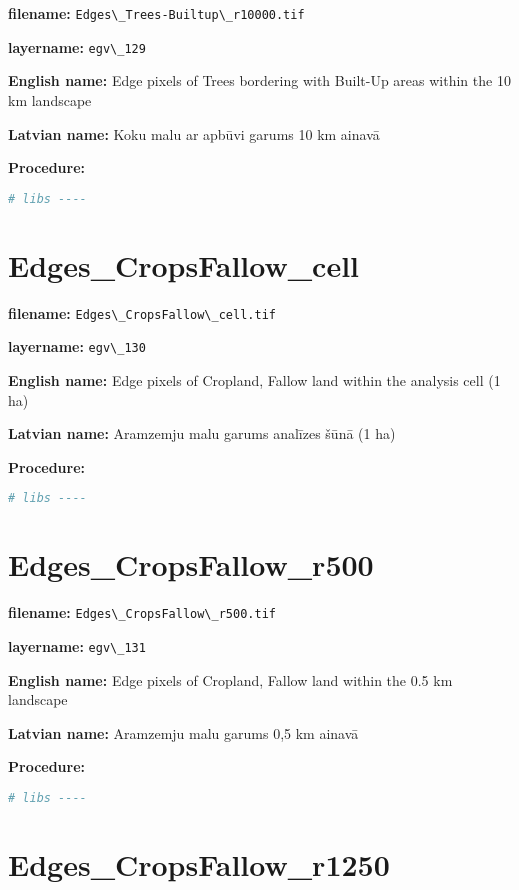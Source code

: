\documentclass[
]{book}
\newcommand{\passthrough}[1]{#1}
\begin{document}
\textbf{filename:} \passthrough{\lstinline!Edges\_Trees-Builtup\_r10000.tif!}

\textbf{layername:} \passthrough{\lstinline!egv\_129!}

\textbf{English name:} Edge pixels of Trees bordering with Built-Up areas within the 10 km landscape

\textbf{Latvian name:} Koku malu ar apbūvi garums 10 km ainavā

\textbf{Procedure:}

\begin{lstlisting}[language=R]
# libs ----
\end{lstlisting}

\section{Edges\_CropsFallow\_cell}\label{ch06.130}

\textbf{filename:} \passthrough{\lstinline!Edges\_CropsFallow\_cell.tif!}

\textbf{layername:} \passthrough{\lstinline!egv\_130!}

\textbf{English name:} Edge pixels of Cropland, Fallow land within the analysis cell (1 ha)

\textbf{Latvian name:} Aramzemju malu garums analīzes šūnā (1 ha)

\textbf{Procedure:}

\begin{lstlisting}[language=R]
# libs ----
\end{lstlisting}

\section{Edges\_CropsFallow\_r500}\label{ch06.131}

\textbf{filename:} \passthrough{\lstinline!Edges\_CropsFallow\_r500.tif!}

\textbf{layername:} \passthrough{\lstinline!egv\_131!}

\textbf{English name:} Edge pixels of Cropland, Fallow land within the 0.5 km landscape

\textbf{Latvian name:} Aramzemju malu garums 0,5 km ainavā

\textbf{Procedure:}

\begin{lstlisting}[language=R]
# libs ----
\end{lstlisting}

\section{Edges\_CropsFallow\_r1250}\label{ch06.132}
\end{document}
